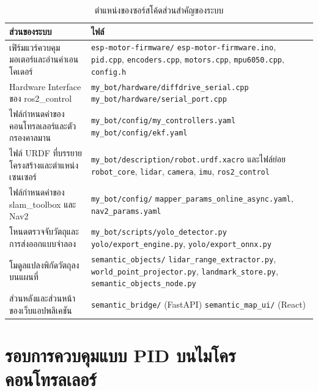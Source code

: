 \documentclass[a4paper,12pt]{report}
\begin{document}
\begin{table}[H]
\centering
\caption[ตำแหน่งของซอร์สโค้ดส่วนสำคัญของระบบ (ภาคผนวก ข)]{ตำแหน่งของซอร์สโค้ดส่วนสำคัญของระบบ}
\label{tab:srcmap}
\small
\begin{tabularx}{\textwidth}{|X|X|}
\hline
\textbf{ส่วนของระบบ} & \textbf{ไฟล์} \\
\hline
เฟิร์มแวร์ควบคุมมอเตอร์และอ่านค่าเอนโคเดอร์
 & \texttt{esp-motor-firmware/} \newline
   \texttt{esp-motor-firmware.ino}, \texttt{pid.cpp}, \texttt{encoders.cpp},
   \texttt{motors.cpp}, \texttt{mpu6050.cpp}, \texttt{config.h} \\
\hline
Hardware Interface ของ ros2\_control
 & \texttt{my\_bot/hardware/diffdrive\_serial.cpp} \newline
   \texttt{my\_bot/hardware/serial\_port.cpp} \\
\hline
ไฟล์กำหนดค่าของคอนโทรลเลอร์และตัวกรองคาลมาน
 & \texttt{my\_bot/config/my\_controllers.yaml} \newline
   \texttt{my\_bot/config/ekf.yaml} \\
\hline
ไฟล์ URDF ที่บรรยายโครงสร้างและตำแหน่งเซนเซอร์
 & \texttt{my\_bot/description/robot.urdf.xacro} และไฟล์ย่อย
   \texttt{robot\_core}, \texttt{lidar}, \texttt{camera}, \texttt{imu},
   \texttt{ros2\_control} \\
\hline
ไฟล์กำหนดค่าของ slam\_toolbox และ Nav2
 & \texttt{my\_bot/config/} \newline
   \texttt{mapper\_params\_online\_async.yaml}, \texttt{nav2\_params.yaml} \\
\hline
โหนดตรวจจับวัตถุและการส่งออกแบบจำลอง
 & \texttt{my\_bot/scripts/yolo\_detector.py} \newline
   \texttt{yolo/export\_engine.py}, \texttt{yolo/export\_onnx.py} \\
\hline
โมดูลแปลงพิกัดวัตถุลงบนแผนที่
 & \texttt{semantic\_objects/} \newline
   \texttt{lidar\_range\_extractor.py}, \texttt{world\_point\_projector.py},
   \texttt{landmark\_store.py}, \texttt{semantic\_objects\_node.py} \\
\hline
ส่วนหลังและส่วนหน้าของเว็บแอปพลิเคชัน
 & \texttt{semantic\_bridge/} (FastAPI) \newline
   \texttt{semantic\_map\_ui/} (React) \\
\hline
\end{tabularx}
\end{table}

\section{รอบการควบคุมแบบ PID บนไมโครคอนโทรลเลอร์}
\end{document}
